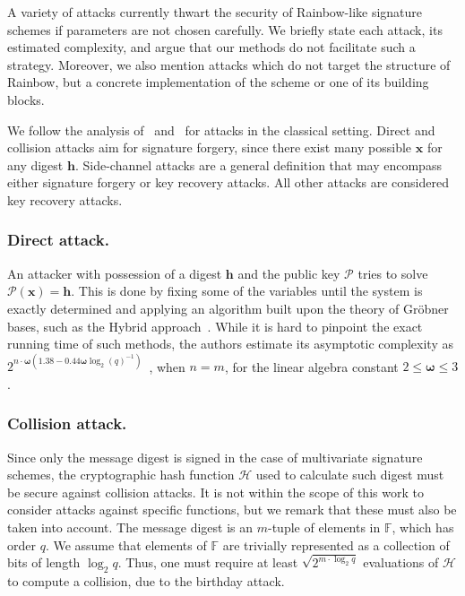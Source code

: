\documentclass[12pt, a4paper, oneside]{memoir}
\theoremstyle{definition}
\begin{document}
A variety of attacks currently thwart the security of Rainbow-like signature schemes if parameters are not chosen carefully. We briefly state each attack, its estimated complexity, and argue that our methods do not facilitate such a strategy. Moreover, we also mention attacks which do not target the structure of Rainbow, but a concrete implementation of the scheme or one of its building blocks.

We follow the analysis of~\cite[Sec.~8]{Ding:201901} and~\cite{Petzoldt:201005} for attacks in the classical setting. Direct and collision attacks aim for signature forgery, since there exist many possible $\mathbf{x}$ for any digest $\mathbf{h}$. Side-channel attacks are a general definition that may encompass either signature forgery or key recovery attacks. All other attacks are considered key recovery attacks.

\subsubsection{Direct attack.}

An attacker with possession of a digest $\mathbf{h}$ and the public key $\mathcal{P}$ tries to solve $\mathcal{P}(\mathbf{x}) = \mathbf{h}$. This is done by fixing some of the variables until the system is exactly determined and applying an algorithm built upon the theory of Gröbner bases, such as the Hybrid approach~\cite{Bettale:201207}. While it is hard to pinpoint the exact running time of such methods, the authors estimate its asymptotic complexity as $2^{n \cdot \bm{\omega} (1.38 - 0.44 \bm{\omega} \log_{2} (q)^{-1})}$~\cite[Thm.~3]{Bettale:201207}, when $n = m$, for the linear algebra constant $2 \leq \bm{\omega} \leq 3$.

\subsubsection{Collision attack.}

Since only the message digest is signed in the case of multivariate signature schemes, the cryptographic hash function $\mathcal{H}$ used to calculate such digest must be secure against collision attacks. It is not within the scope of this work to consider attacks against specific functions, but we remark that these must also be taken into account. The message digest is an $m$-tuple of elements in $\mathbb{F}$, which has order $q$. We assume that elements of $\mathbb{F}$ are trivially represented as a collection of bits of length $\log_{2} q$. Thus, one must require at least $\sqrt{2^{m \cdot \log_{2} q}}$ evaluations of $\mathcal{H}$ to compute a collision, due to the birthday attack.
\end{document}
